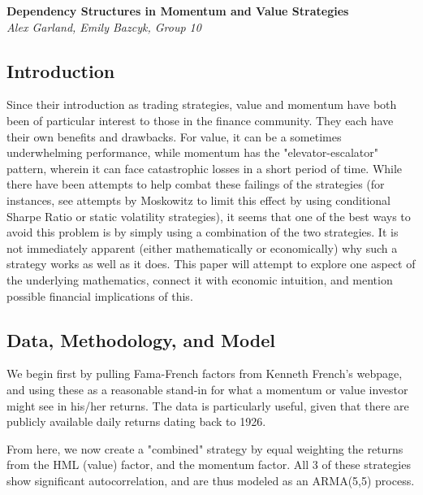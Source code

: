 \documentclass[12pt,letterpaper]{memoir}
\begin{document}
    \vspace*{-50pt}
    \begin{center}
    	\textbf{{\large Dependency Structures in Momentum and Value Strategies}}
    	\\
    	\textit{Alex Garland, Emily Bazcyk, Group 10}
    \end{center}
    
\subsection*{Introduction}
Since their introduction as trading strategies, value and momentum have both been of particular interest to those in the finance community. They each have their own benefits and drawbacks. For value, it can be a sometimes underwhelming performance, while momentum has the "elevator-escalator" pattern, wherein it can face catastrophic losses in a short period of time. While there have been attempts to help combat these failings of the strategies (for instances, see attempts by Moskowitz to limit this effect by using conditional Sharpe Ratio or static volatility strategies), it seems that one of the best ways to avoid this problem is by simply using a combination of the two strategies. It is not immediately apparent (either mathematically or economically) why such a strategy works as well as it does. This paper will attempt to explore one aspect of the underlying mathematics, connect it with economic intuition, and mention possible financial implications of this.
\subsection*{Data, Methodology, and Model}
We begin first by pulling Fama-French factors from Kenneth French's webpage, and using these as a reasonable stand-in for what a momentum or value investor might see in his/her returns. The data is particularly useful, given that there are publicly available daily returns dating back to 1926.

From here, we now create a "combined" strategy by equal weighting the returns from the HML (value) factor, and the momentum factor. All 3 of these strategies show significant autocorrelation, and are thus modeled as an ARMA(5,5) process.
\end{document}
